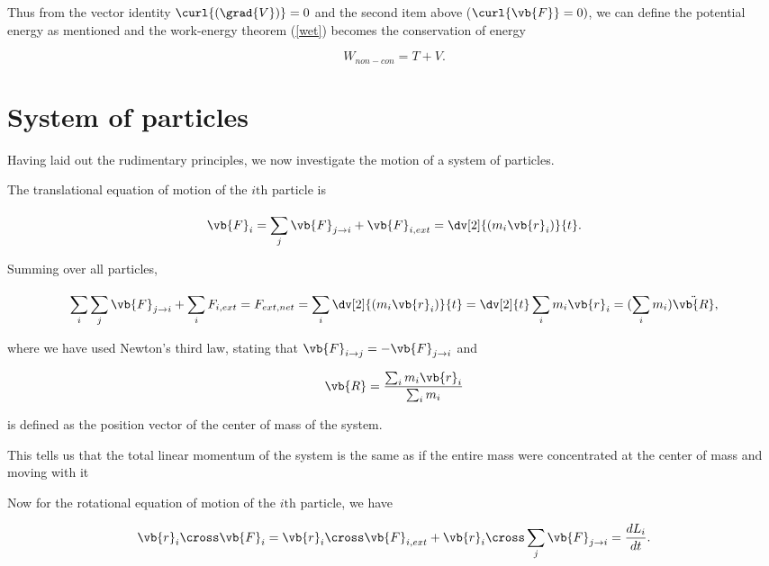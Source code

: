 \documentclass[a4paper,12pt]{report}
\begin{document}
Thus from the vector identity \(\curl{(\grad{V}) } = 0\) and the second item above (\(\curl{\vb{F} } =0)\), we can define the potential energy as mentioned and the work-energy theorem (\cref{wet}) becomes the conservation of energy

\begin{equation}
	W_{non-con} = T + V. \label{con} 
\end{equation}




\section{System of particles}
Having laid out the rudimentary principles, we now investigate the motion of a system of particles.

The translational equation of motion of the \(i \text{th} \) particle is 

\begin{equation}
	\vb{F} _{i} = \sum_{j}^{} \vb{F} _{j \rightarrow i} + \vb{F} _{i, ext} = \dv[2]{(m_{i} \vb{r} _{i} )}{t}     .
\end{equation}
 
Summing over all particles,

\begin{equation}
	\sum_{i}^{} \sum_{j}^{} \vb{F} _{j \rightarrow i} + \sum_{i}^{} F_{i,ext} = F_{ext, net } =  \sum_{i}^{} \dv[2]{(m_{i} \vb{r} _{i} )}{t} = \dv[2]{t} \sum_{i}^{} m_{i} \vb{r} _{i} =  (\sum_{i}^{} m_{i} ) \ddot{\vb{R} },
\end{equation}

where we have used Newton's third law, stating that \(\vb{F} _{i \rightarrow j} = -\vb{F} _{j \rightarrow i} \) and  

\begin{equation}
	\vb{R} = \frac{\sum_{i}^{} m_{i} \vb{r} _{i} }{\sum_{i}^{} m_{i}  } 
\end{equation}

is defined as the position vector of the center of mass of the system.

This tells us that the total linear momentum of the system is the same as if the entire mass were concentrated at the center of mass and moving with it

Now for the rotational equation of motion of the \(i \text{th} \) particle, we have

\begin{equation}
	 \vb{r }_{i}  \cross \vb{F} _{i} = \vb{r} _{i} \cross \vb{F} _{i, ext} + \vb{r} _{i} \cross \sum_{j}^{} \vb{F} _{j \rightarrow i} = \frac{dL_{i} }{dt}. 
\end{equation}
\end{document}
